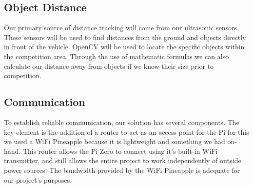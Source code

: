 \documentclass[onecolumn, draftclsnofoot,10pt, compsoc]{IEEEtran}
\begin{document}
\subsection{Object Distance}
Our primary source of distance tracking will come from our ultrasonic sensors. These sensors will be used to find distances from the ground and objects directly in front of the vehicle. OpenCV will be used to locate the specific objects within the competition area. Through the use of mathematic formulas we can also calculate our distance away from objects if we know their size prior to competition. 

\subsection{Communication}
To establish reliable communication, our solution has several components. The key element is the addition of a router to act as an access point for the Pi for this we used a WiFi Pineapple because it is lightweight and something we had on-hand. This router allows the Pi Zero to connect using it's built-in WiFi transmitter, and still allows the entire project to work independently of outside power sources. The bandwidth provided by the WiFi Pineapple is adequate for our project's purposes. 


\newpage
\end{document}
